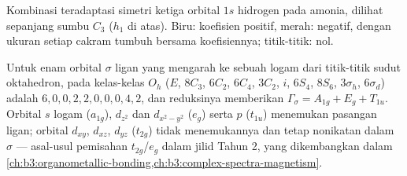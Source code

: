 \begin{omfigure}

{\small Kombinasi teradaptasi simetri ketiga orbital $1s$ hidrogen pada
amonia, dilihat sepanjang sumbu $C_3$ ($h_1$ di atas). Biru: koefisien positif,
merah: negatif, dengan ukuran setiap cakram tumbuh bersama koefisiennya;
titik-titik: nol.}
\end{omfigure}

\begin{example}\label{ex:b3:group-theory-applied:ml6}
Untuk enam orbital $\sigma$ ligan yang mengarah ke sebuah logam dari
titik-titik sudut oktahedron,  pada kelas-kelas $O_h$
($E$, $8C_3$, $6C_2$, $6C_4$, $3C_2$, $i$, $6S_4$, $8S_6$, $3\sigma_h$, $6\sigma_d$)
adalah $6, 0, 0, 2, 2, 0, 0, 0, 4,
2$, dan reduksinya memberikan $\Gamma_\sigma = A_{1g} + E_g + T_{1u}$. Orbital $s$
logam ($a_{1g}$), $d_{z^2}$ dan $d_{x^2-y^2}$ ($e_g$) serta $p$ ($t_{1u}$)
menemukan pasangan ligan; orbital $d_{xy}$, $d_{xz}$, $d_{yz}$ ($t_{2g}$) tidak
menemukannya dan tetap nonikatan dalam $\sigma$ --- asal-usul pemisahan
$t_{2g}$/$e_g$ dalam jilid Tahun 2, yang dikembangkan dalam
\cref{ch:b3:organometallic-bonding,ch:b3:complex-spectra-magnetism}.
\end{example}


